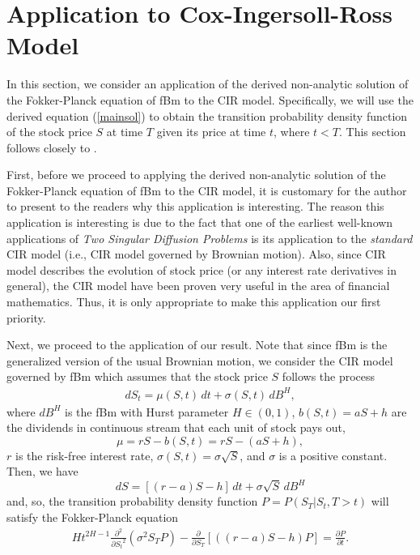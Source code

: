 \documentclass[preprint, 12pt]{elsarticle}
\numberwithin{equation}{section}
\theoremstyle{plain}
\theoremstyle{remark}
\begin{document}
\section{Application to Cox-Ingersoll-Ross Model}\label{application}

In this section, we consider an application of the derived non-analytic solution of the Fokker-Planck equation of fBm to the CIR model. Specifically, we will use the derived equation (\ref{mainsol}) to obtain the transition probability density function of the stock price $S$ at time $T$ given its price at time $t$, where $t<T$. This section follows closely to \citep{Hsu}.

First, before we proceed to applying the derived non-analytic solution of the Fokker-Planck equation of fBm to the CIR model, it is customary for the author to present to the readers why this application is interesting. The reason this application is interesting is due to the fact that one of the earliest well-known applications of \textit{Two Singular Diffusion Problems} \citep{Feller} is its application to the \emph{standard} CIR model (i.e., CIR model governed by Brownian motion). Also, since CIR model describes the evolution of stock price (or any interest rate derivatives in general), the CIR model have been proven very useful in the area of financial mathematics. Thus, it is only appropriate to make this application our first priority.

Next, we proceed to the application of our result. Note that since fBm is the generalized version of the usual Brownian motion, we consider the CIR model governed by fBm which assumes that the stock price $S$ follows the process
\begin{eqnarray}
dS_t = \mu (S,t)\,dt + \sigma(S,t)\,dB^{H} \label{gCEV}, 
\end{eqnarray}
where $\displaystyle{dB^H}$ is the fBm with Hurst parameter $\displaystyle{H \in (0,1)}$, $b(S,t) = aS+h$ are the dividends in continuous stream that each unit of stock pays out,
\[\mu = rS - b(S,t) = rS - (aS+h),\]
$r$ is the risk-free interest rate, $\sigma(S,t) = \sigma\sqrt{S}$, and $\sigma$ is a positive constant. Then, we have 
\[dS = [(r-a)S-h]\,dt + \sigma\sqrt{S}\,dB^H\]
and, so, the transition probability density function $P=P(S_T | S_t, T>t)$ will satisfy the Fokker-Planck equation
\begin{eqnarray}
H t^{2H - 1}  \frac{\partial^2}{\partial {S_t}^2}(\sigma^2 S_T P) - \frac{\partial}{\partial S_T}[((r-a)S - h)P] = \frac{\partial P}{\partial t}.
\end{eqnarray}
\end{document}
